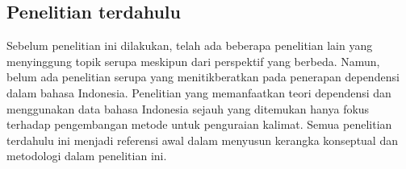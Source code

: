\subsection{Penelitian terdahulu}

Sebelum penelitian ini dilakukan, telah ada beberapa penelitian lain yang menyinggung topik serupa meskipun dari perspektif yang berbeda. Namun, belum ada penelitian serupa yang menitikberatkan pada penerapan dependensi dalam bahasa Indonesia. Penelitian yang memanfaatkan teori dependensi dan menggunakan data bahasa Indonesia sejauh yang ditemukan hanya fokus terhadap pengembangan metode untuk penguraian kalimat. Semua penelitian terdahulu ini menjadi referensi awal dalam menyusun kerangka konseptual dan metodologi dalam penelitian ini.

